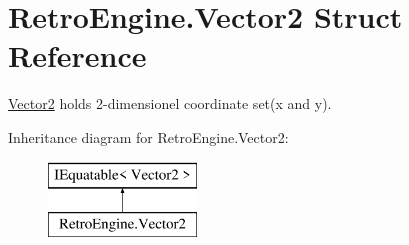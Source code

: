 \hypertarget{struct_retro_engine_1_1_vector2}{}\section{Retro\+Engine.\+Vector2 Struct Reference}
\label{struct_retro_engine_1_1_vector2}


\mbox{\hyperlink{struct_retro_engine_1_1_vector2}{Vector2}} holds 2-\/dimensionel coordinate set(x and y).  


Inheritance diagram for Retro\+Engine.\+Vector2\+:\begin{figure}[H]
\begin{center}
\leavevmode
\includegraphics[height=2.000000cm]{struct_retro_engine_1_1_vector2}
\end{center}
\end{figure}
